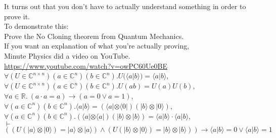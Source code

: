 \documentclass{exam}
\def\land{\wedge}           %
\def\lor{\vee}              %
\def\proves{\vdash}
\newcommand{\bra}[1]{\langle#1|}
\newcommand{\ket}[1]{|#1\rangle}
\newcommand{\braket}[2]{\langle#1|#2\rangle}
\def\R{\mathbb{R}}
\def\C{\mathbb{C}}
\begin{document}
\begin{questions}

\pagebreak

\question

It turns out that you don't have to actually understand something in order to prove it.\\
$\ $\\
To demonstrate this:\\
Prove the No Cloning theorem from Quantum Mechanics.\\
If you want an explanation of what you're actually proving,\\
Minute Physics did a video on YouTube.\\
\url{https://www.youtube.com/watch?v=owPC60Ue0BE}\\
$\ $\\
$\forall (U\in \C^{n\times n}) (a\in \C^n) (b\in \C^n). U(\braket a b) = \braket a b$,\\
$\forall (U\in \C^{n\times n}) (a\in \C^n) (b\in \C^n). U(a b) = U(a) U(b)$,\\
$\forall a\in \R.\ (a\cdot a = a) \to (a = 0 \lor a = 1)$,\\
$\forall (a\in \C^n) (b\in \C^n). \braket a b = (\bra a \otimes\bra 0)(\ket b \otimes \ket 0)$,\\
$\forall (a\in \C^n) (b\in \C^n). (\bra a \otimes\bra a)(\ket b \otimes \ket b) = \braket a b \cdot \braket a b $,\\
$\proves$\\
$((U(\ket a \otimes \ket 0) = \ket a \otimes\ket a) \land 
(U(\ket b \otimes\ket 0)  = \ket b \otimes\ket b)) \to
\braket a b = 0 \lor \braket a b = 1$\\



\end{questions}
\end{document}
